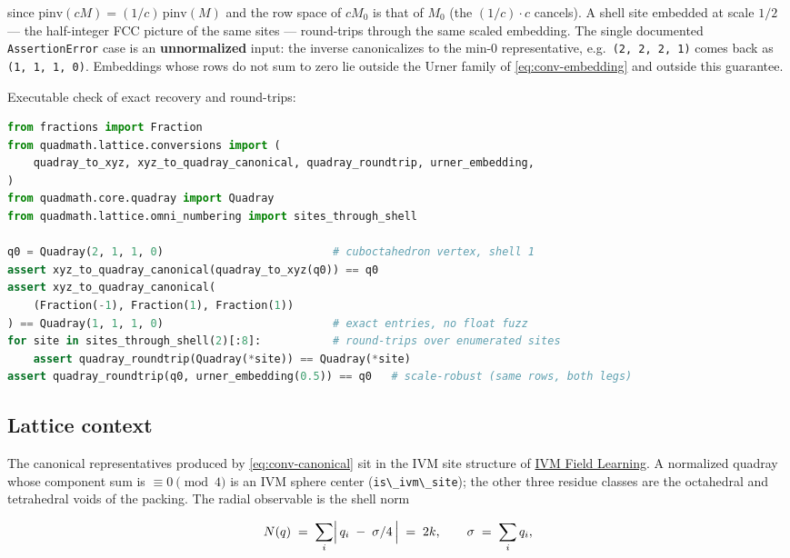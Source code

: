 \documentclass[
  10pt,
]{article}
\newcommand{\passthrough}[1]{#1}
\begin{document}
since \(\mathrm{pinv}(cM) = (1/c)\,\mathrm{pinv}(M)\) and the row space
of \(cM_0\) is that of \(M_0\) (the \((1/c)\cdot c\) cancels). A shell
site embedded at scale \(1/2\) --- the half-integer FCC picture of the
same sites --- round-trips through the same scaled embedding. The single
documented \passthrough{\lstinline!AssertionError!} case is an
\textbf{unnormalized} input: the inverse canonicalizes to the min-0
representative, e.g.~\passthrough{\lstinline!(2, 2, 2, 1)!} comes back
as \passthrough{\lstinline!(1, 1, 1, 0)!}. Embeddings whose rows do not
sum to zero lie outside the Urner family of \eqref{eq:conv-embedding}
and outside this guarantee.

Executable check of exact recovery and round-trips:

\begin{lstlisting}[language=Python]
from fractions import Fraction
from quadmath.lattice.conversions import (
    quadray_to_xyz, xyz_to_quadray_canonical, quadray_roundtrip, urner_embedding,
)
from quadmath.core.quadray import Quadray
from quadmath.lattice.omni_numbering import sites_through_shell

q0 = Quadray(2, 1, 1, 0)                          # cuboctahedron vertex, shell 1
assert xyz_to_quadray_canonical(quadray_to_xyz(q0)) == q0
assert xyz_to_quadray_canonical(
    (Fraction(-1), Fraction(1), Fraction(1))
) == Quadray(1, 1, 1, 0)                          # exact entries, no float fuzz
for site in sites_through_shell(2)[:8]:           # round-trips over enumerated sites
    assert quadray_roundtrip(Quadray(*site)) == Quadray(*site)
assert quadray_roundtrip(q0, urner_embedding(0.5)) == q0   # scale-robust (same rows, both legs)
\end{lstlisting}

\subsection{Lattice context}\label{lattice-context}

The canonical representatives produced by \eqref{eq:conv-canonical} sit
in the IVM site structure of \href{11_ivm_field_learning.md}{IVM Field
Learning}. A normalized quadray whose component sum is
\(\equiv 0 \pmod 4\) is an IVM sphere center
(\passthrough{\lstinline!is\_ivm\_site!}); the other three residue
classes are the octahedral and tetrahedral voids of the packing. The
radial observable is the shell norm

\begin{equation}
\label{eq:conv-shell}
N(q) \;=\; \sum_{i} \Bigl|\, q_i \;-\; \sigma/4 \,\Bigr| \;=\; 2k,
\qquad \sigma \;=\; \sum_{i} q_i ,
\end{equation}
\end{document}
